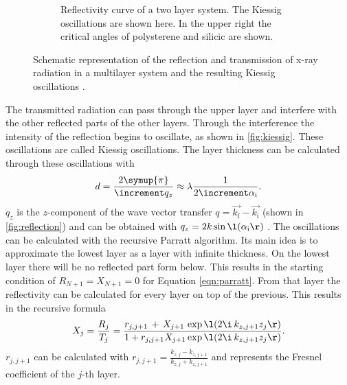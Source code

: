 \begin{figure}
\begin{subfigure}{0.47\textwidth}
        \caption{Reflectivity curve of a two layer system.
        The Kiessig oscillations are shown here.
        In the upper right the critical angles of polysterene and silicic are shown.}
        \label{fig:kiessig}
    \end{subfigure}
    \caption{Schematic representation of the reflection and transmission of x-ray radiation in a multilayer system and the resulting Kiessig oscillations \cite[12--14]{V44:xrr_tolan}.}
    \label{fig:ml_kiessig}
    \hfill
\end{figure}
The transmitted radiation can pass through the upper layer and interfere with the other reflected parts of the other layers.
Through the interference the intensity of the reflection begins to oscillate, as shown in \autoref{fig:kiessig}.
These oscillations are called Kiessig oscillations.
The layer thickness can be calculated through these oscillations with
\begin{equation}
    d = \frac{2\symup{\pi}}{\increment q_z} \approx \lambda \frac{1}{2\increment\alpha_\text{i}}.
    \label{eqn:thickness}
\end{equation}
$q_z$ is the $z$-component of the wave vector transfer $q=\vec{k_\text{f}}-\vec{k_\text{i}}$ (shown in \autoref{fig:reflection}) and can be obtained with $q_z=2k\sin\l(\alpha_\text{i}\r)$ \cite[14]{V44:xrr_tolan}.
The oscillations can be calculated with the recursive Parratt algorithm.
Its main idea is to approximate the lowest layer as a layer with infinite thickness.
On the lowest layer there will be no reflected part form below.
This results in the starting condition of $R_{N+1}=X_{N+1}=0$ for Equation \eqref{eqn:parratt}.
From that layer the reflectivity can be calculated for every layer on top of the previous.
This results in the recursive formula \cite[12]{V44:xrr_tolan}\cite{V44:parratt}
\begin{equation}
    X_j = \frac{R_j}{T_j} = \frac{r_{j,j+1}\,+\,X_{j+1}\,\exp\l(2\i\,k_{z,j+1}z_j\r)}{1+r_{j,j+1}X_{j+1}\exp\l(2\i\,k_{z,j+1}z_j\r)}.
    \label{eqn:parratt}
\end{equation}
$r_{j,j+1}$ can be calculated with $r_{j,j+1}=\frac{k_{z,j}-k_{z,j+1}}{k_{z,j}+k_{z,j+1}}$ and represents the Fresnel coefficient of the $j$-th layer.

